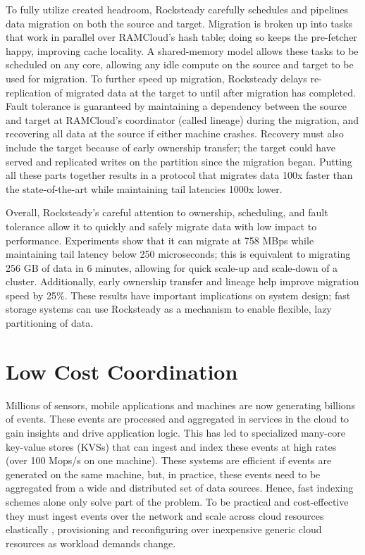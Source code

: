 To fully utilize created headroom, Rocksteady carefully schedules and
pipelines data migration on both the source and target.
%
Migration is
broken up into tasks that work in parallel over RAMCloud’s hash table;
doing so keeps the pre-fetcher happy, improving cache locality.
%
A shared-memory model allows these tasks to be scheduled on any core,
allowing any idle compute on the source and target to be used for
migration.
%
To further speed up migration, Rocksteady delays
re-replication of migrated data at the target to until after migration
has completed.
%
Fault tolerance is guaranteed by maintaining a dependency
between the source and target at RAMCloud’s coordinator (called lineage)
during the migration, and recovering all data at the source if either
machine crashes.
%
Recovery must also include the target because of early
ownership transfer; the target could have served and replicated writes
on the partition since the migration began.
%
Putting all these parts
together results in a protocol that migrates data 100x faster than the
state-of-the-art while maintaining tail latencies 1000x lower.

Overall, Rocksteady’s careful attention to ownership, scheduling, and
fault tolerance allow it to quickly and safely migrate data with low
impact to performance.
%
Experiments show that it can migrate at 758 MBps
while maintaining tail latency below 250 microseconds; this is
equivalent to migrating 256 GB of data in 6 minutes, allowing for quick
scale-up and scale-down of a cluster.
%
Additionally, early ownership transfer and
lineage help improve migration speed by 25\%.
%
These results have
important implications on system design; fast storage systems can use
Rocksteady as a mechanism to enable flexible, lazy partitioning of
data.

\section{Low Cost Coordination}

Millions of sensors, mobile applications and machines are now
generating billions of events.
%
These events are processed and
aggregated in services in the cloud to gain insights and drive application
logic.
%
This has led to specialized many-core key-value stores (KVSs) that can
ingest and index these events at high rates (over 100 Mops/s on one machine).
%
These systems are efficient if events are
generated on the same machine, but,
%
in practice, these events need
to be aggregated from a wide and distributed set of data sources. Hence, fast
indexing schemes alone only solve part of the problem.
%
To be practical and
cost-effective they must ingest
events over the network and scale across cloud resources elastically
, provisioning and reconfiguring over inexpensive generic
cloud resources as workload demands change.

